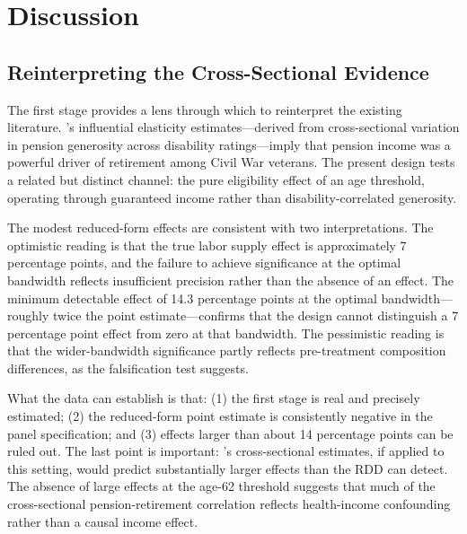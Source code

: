 \documentclass[12pt]{article}
\begin{document}



\section{Discussion}

\subsection{Reinterpreting the Cross-Sectional Evidence}

The first stage provides a lens through which to reinterpret the existing literature. \citeauthor{costa1995pensions}'s \citeyearpar{costa1995pensions} influential elasticity estimates---derived from cross-sectional variation in pension generosity across disability ratings---imply that pension income was a powerful driver of retirement among Civil War veterans. The present design tests a related but distinct channel: the pure eligibility effect of an age threshold, operating through guaranteed income rather than disability-correlated generosity.

The modest reduced-form effects are consistent with two interpretations. The optimistic reading is that the true labor supply effect is approximately 7 percentage points, and the failure to achieve significance at the optimal bandwidth reflects insufficient precision rather than the absence of an effect. The minimum detectable effect of 14.3 percentage points at the optimal bandwidth---roughly twice the point estimate---confirms that the design cannot distinguish a 7 percentage point effect from zero at that bandwidth. The pessimistic reading is that the wider-bandwidth significance partly reflects pre-treatment composition differences, as the falsification test suggests.

What the data can establish is that: (1) the first stage is real and precisely estimated; (2) the reduced-form point estimate is consistently negative in the panel specification; and (3) effects larger than about 14 percentage points can be ruled out. The last point is important: \citeauthor{costa1995pensions}'s cross-sectional estimates, if applied to this setting, would predict substantially larger effects than the RDD can detect. The absence of large effects at the age-62 threshold suggests that much of the cross-sectional pension-retirement correlation reflects health-income confounding rather than a causal income effect.
\end{document}
